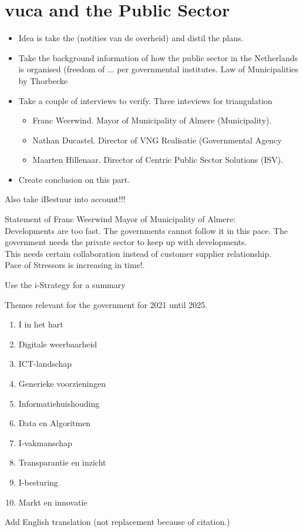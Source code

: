 \chapter{\acrshort{vuca} and the Public Sector}
\label{ch:vucaandpublicsector}

\begin{itemize}
\item{Idea is take the (notities van de overheid) and distil the plans.}
\item{Take the background information of how the public sector in the Netherlands is organised (freedom of ... per governmental institutes. Law of Municipalities by Thorbecke }
\item{Take a couple of interviews to verify. Three inteviews for triangulation}
\begin{itemize}
	\item{Franc Weerwind. Mayor of Municipality of Almere (Municipality).}
	\item{Nathan Ducastel. Director of VNG Realisatie (Governmental Agency}
	\item{Maarten Hillenaar. Director of Centric Public Sector Solutions (ISV).}
\end{itemize}
\item{Create conclusion on this part.}
\end{itemize}

\begin{remark}
	Also take iBestuur into account!!!
\end{remark}

Statement of Franc Weerwind Mayor of Municipality of Almere:\\
Developments are too fast. The governments cannot follow it in this pace. The government needs the private sector to keep up with developments.\\
This needs certain collaboration instead of customer supplier relationship.\\
Pace of Stressors is increasing in time!.\\

\begin{remark}
	Use the i-Strategy for a summary \parencite{Digitaleoverheid}
\end{remark}

Themes relevant for the government for 2021 until 2025.

\begin{enumerate}
	\item{I in het hart}
	\item{Digitale weerbaarheid}
	\item{ICT-landschap}
	\item{Generieke voorzieningen}
	\item{Informatiehuishouding}
	\item{Data en Algoritmen}
	\item{I-vakmanschap}
	\item{Transparantie en inzicht}
	\item{I-besturing}
	\item{Markt en innovatie}
\end{enumerate}

\begin{remark}
	Add English translation (not replacement because of citation.)
\end{remark}